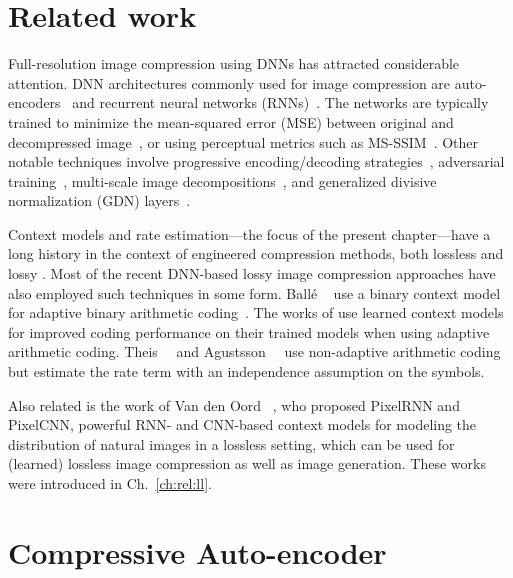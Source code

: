\section{Related work}

Full-resolution image compression using DNNs has attracted considerable
attention. DNN architectures commonly used for image compression are
auto-encoders~\cite{theis2017lossy, balle2016end, agustsson2017soft,
li2017learning} and recurrent neural networks (RNNs)~\cite{toderici2015variable, toderici2016full}. The networks are typically
trained to minimize the mean-squared error (MSE) between original and
decompressed image~\cite{theis2017lossy, balle2016end, agustsson2017soft,
li2017learning}, or using perceptual metrics such as MS-SSIM~\cite{toderici2016full, rippel17a}. Other notable techniques involve
progressive encoding/decoding strategies~\cite{toderici2015variable,
toderici2016full}, adversarial training~\cite{rippel17a}, multi-scale image
decompositions~\cite{rippel17a}, and generalized divisive normalization (GDN)
layers~\cite{balle2015density}.

Context models and rate estimation---the focus of the present chapter---have
a long history in the context of engineered compression methods, both lossless
and lossy \cite{context1,context2,context3,context4,marpe2003context}.  Most of
the recent DNN-based lossy image compression approaches have also employed such
techniques in some form. Ballé \etal~\cite{balle2016end} use a binary context
model for adaptive binary arithmetic coding~\cite{marpe2003context}.  The works
of \cite{toderici2016full,li2017learning,rippel17a} use learned context models
for improved coding performance on their trained models when using adaptive
arithmetic coding. Theis~\etal~\cite{theis2017lossy} and
Agustsson~\etal~\cite{agustsson2017soft} use non-adaptive arithmetic coding but
estimate the rate term with an independence assumption on the symbols.

Also related is the work of Van den Oord \etal~\cite{van2016pixel,
van2016conditional}, who proposed PixelRNN and PixelCNN, powerful RNN- and
CNN-based context models for modeling the distribution of natural images in a
lossless setting, which can be used for (learned) lossless image compression as
well as image generation. These works were introduced in Ch.~\ref{ch:rel:ll}.

\section{Compressive Auto-encoder}

